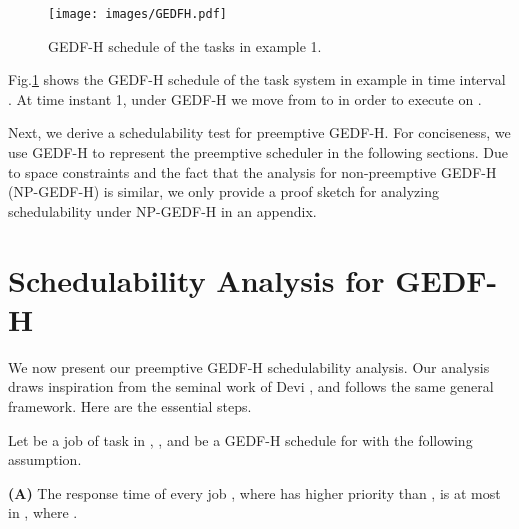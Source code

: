 \documentclass[Times, 10pt,twocolumn]{article}
\theoremstyle{definition}
\begin{document}
\begin{figure}[t]
	\begin{center}
	\texttt{[image: images/GEDFH.pdf]} 
	\end{center} 
\vspace{-5mm}
\caption{\small GEDF-H schedule of the tasks in example 1.}
\vspace{-5mm}
\label{fig:GEDFH}
\end{figure}

Fig.\ref{fig:GEDFH} shows the GEDF-H schedule of the task system in example  in time interval . At time instant 1, under GEDF-H we move  from  to  in order to execute  on . 

Next, we derive a schedulability test for preemptive GEDF-H. For conciseness, we use GEDF-H to represent the preemptive scheduler in the following sections. Due to space constraints and the fact that the analysis for non-preemptive GEDF-H (NP-GEDF-H) is similar, we only provide a proof sketch for analyzing schedulability under NP-GEDF-H in an appendix.

\section{Schedulability Analysis for GEDF-H}
\label{sec:EDF}

We now present our preemptive GEDF-H schedulability analysis. Our analysis draws inspiration from the seminal work of Devi \cite{Devi}, and follows the same general framework. Here are the essential steps.

Let  be a job of task  in , , and  be a GEDF-H schedule for  with the following assumption.

\vspace{1.5mm}
\textbf{(A)} The response time of every job , where  has higher priority than , is at most  in , where .
\vspace{1.5mm}
\end{document}
